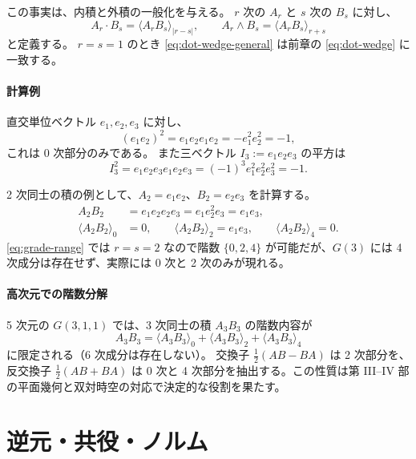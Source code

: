 \documentclass[dvipdfmx,a4paper,oneside]{jsbook}
\numberwithin{equation}{chapter}
\begin{document}
この事実は、内積と外積の一般化を与える。
\(r\) 次の \(A_r\) と \(s\) 次の \(B_s\) に対し、
\begin{equation}
  A_r \cdot B_s = \langle A_r B_s \rangle_{|r-s|}, \qquad
  A_r \wedge B_s = \langle A_r B_s \rangle_{r+s}
  \label{eq:dot-wedge-general}
\end{equation}
と定義する。
\(r=s=1\) のとき \eqref{eq:dot-wedge-general} は前章の \eqref{eq:dot-wedge} に一致する。

\paragraph{計算例}
直交単位ベクトル \(e_1,e_2,e_3\) に対し、
\begin{equation}
  (e_1 e_2)^2 = e_1 e_2 e_1 e_2 = -e_1^2 e_2^2 = -1,
  \label{eq:biv-square-g3}
\end{equation}
これは 0 次部分のみである。
また三ベクトル \(I_3 := e_1 e_2 e_3\) の平方は
\begin{equation}
  I_3^2 = e_1 e_2 e_3 e_1 e_2 e_3 = (-1)^3 e_1^2 e_2^2 e_3^2 = -1.
  \label{eq:trivector-square}
\end{equation}

2 次同士の積の例として、\(A_2 = e_1 e_2\)、\(B_2 = e_2 e_3\) を計算する。
\begin{align}
  A_2 B_2 &= e_1 e_2 e_2 e_3 = e_1 e_2^2 e_3 = e_1 e_3, \\
  \langle A_2 B_2 \rangle_0 &= 0, \qquad
  \langle A_2 B_2 \rangle_2 = e_1 e_3, \qquad
  \langle A_2 B_2 \rangle_4 = 0.
\end{align}
\eqref{eq:grade-range} では \(r=s=2\) なので階数 \(\{0,2,4\}\) が可能だが、\(G(3)\) には 4 次成分は存在せず、実際には 0 次と 2 次のみが現れる。

\paragraph{高次元での階数分解}
5 次元の \(G(3,1,1)\) では、3 次同士の積 \(A_3 B_3\) の階数内容が
\begin{equation}
  A_3 B_3 = \langle A_3 B_3 \rangle_0 + \langle A_3 B_3 \rangle_2 + \langle A_3 B_3 \rangle_4
  \label{eq:grade-3-product}
\end{equation}
に限定される（6 次成分は存在しない）。
交換子 \(\tfrac{1}{2}(AB-BA)\) は 2 次部分を、反交換子 \(\tfrac{1}{2}(AB+BA)\) は 0 次と 4 次部分を抽出する。この性質は第 III--IV 部の平面幾何と双対時空の対応で決定的な役割を果たす。

\section{逆元・共役・ノルム}
\end{document}
